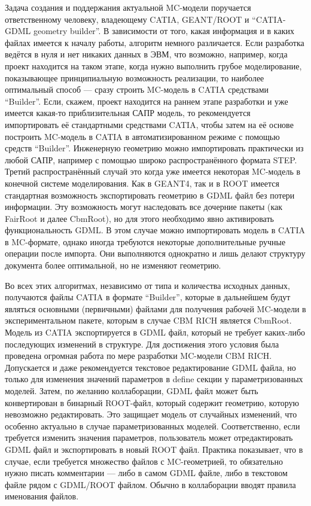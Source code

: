 Задача создания и поддержания актуальной MC-модели поручается ответственному человеку, владеющему CATIA, GEANT/ROOT и ``CATIA-GDML geometry builder''. В зависимости от того, какая информация и в каких файлах имеется к началу работы, алгоритм немного различается. Если разработка ведётся в нуля и нет никаких данных в ЭВМ, что возможно, например, когда проект находится на таком этапе, когда нужно выполнить грубое моделирование, показывающее принципиальную возможность реализации, то наиболее оптимальный способ --- сразу строить MC-модель в CATIA средствами ``Builder''. Если, скажем, проект находится на раннем этапе разработки и уже имеется какая-то приблизительная САПР модель, то рекомендуется импортировать её стандартными средствами CATIA, чтобы затем на её основе построить MC-модель в CATIA в автоматизированном режиме с помощью средств ``Builder''. Инженерную геометрию можно импортировать практически из любой САПР, например с помощью широко распространённого формата STEP. Третий распространённый случай это когда уже имеется некоторая MC-модель в конечной системе моделирования. Как в GEANT4, так и в ROOT имеется стандартная возможность экспортировать геометрию в GDML файл без потери информации. Эту возможность могут наследовать все дочерние пакеты (как FairRoot и далее CbmRoot), но для этого необходимо явно активировать функциональность GDML. В этом случае можно импортировать модель в CATIA в MC-формате, однако иногда требуются некоторые дополнительные ручные операции после импорта. Они выполняются однократно и лишь делают структуру документа более оптимальной, но не изменяют геометрию.

Во всех этих алгоритмах, независимо от типа и количества исходных данных, получаются файлы CATIA в формате ``Builder'', которые в дальнейшем будут являться основными (первичными) файлами для получения рабочей MC-модели в экспериментальном пакете, которым в случае CBM RICH является CbmRoot. Модель из CATIA экспортируется в GDML файл, который не требует каких-либо последующих изменений в структуре. Для достижения этого условия была проведена огромная работа по мере разработки MC-модели CBM RICH. Допускается и даже рекомендуется текстовое редактирование GDML файла, но только для изменения значений параметров в define секции у параметризованных моделей. Затем, по желанию коллаборации, GDML файл может быть конвертирован в бинарный ROOT-файл, который содержит геометрию, которую невозможно редактировать. Это защищает модель от случайных изменений, что особенно актуально в случае параметризованных моделей. Соответственно, если требуется изменить значения параметров, пользователь может отредактировать GDML файл и экспортировать в новый ROOT файл. Практика показывает, что в случае, если требуется множество файлов с MC-геометрией, то обязательно нужно писать комментарии --- либо в самом GDML файле, либо в текстовом файле рядом с GDML/ROOT файлом. Обычно в коллаборации вводят правила именования файлов.

